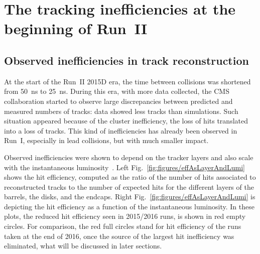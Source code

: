 
\clearpage

\setcounter{secnumdepth}{4}
\setcounter{secnumdepth}{4}


\section{The tracking inefficiencies at the beginning of Run~II~\label{sec:hitIneff}}

\subsection{Observed inefficiencies in track reconstruction}

At the start of the Run~II 2015D era, the time between collisions was shortened from 50~ns to 25~ns. During this era, with more data collected, the CMS collaboration started to observe large discrepancies between predicted and measured numbers of tracks: data showed less tracks than simulations. Such situation appeared because of the cluster inefficiency, the loss of hits translated into a loss of tracks. This kind of inefficiencies has already been observed in Run~I, especially in lead collisions, but with much smaller impact. 

Observed inefficiencies were shown to depend on the tracker layers and also scale with the instantaneous luminosity~\cite{website:hitEff}. Left Fig.~\ref{fig:figures/effAsLayerAndLumi} shows the hit efficiency, computed as the ratio of the number of hits associated to reconstructed tracks to the number of expected hits for the different layers of the barrels, the disks, and the endcaps. Right Fig.~\ref{fig:figures/effAsLayerAndLumi} is depicting the hit efficiency  as a function of the instantaneous luminosity. In these plots, the reduced hit efficiency seen in 2015/2016 runs, is shown in red empty circles. For comparison, the red full circles stand for hit efficiency of the runs taken at the end of 2016, once the source of the largest hit inefficiency was eliminated, what will be discussed in later sections.


